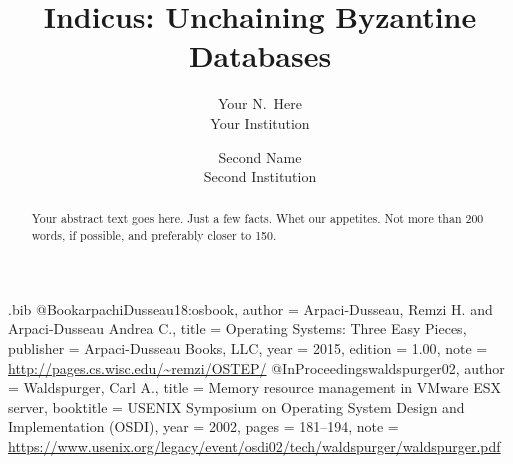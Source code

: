 \usepackage{filecontents}

\begin{filecontents}{\jobname.bib}
@Book{arpachiDusseau18:osbook,
  author =       {Arpaci-Dusseau, Remzi H. and Arpaci-Dusseau Andrea C.},
  title =        {Operating Systems: Three Easy Pieces},
  publisher =    {Arpaci-Dusseau Books, LLC},
  year =         2015,
  edition =      {1.00},
  note =         {\url{http://pages.cs.wisc.edu/~remzi/OSTEP/}}
}
@InProceedings{waldspurger02,
  author =       {Waldspurger, Carl A.},
  title =        {Memory resource management in {VMware ESX} server},
  booktitle =    {USENIX Symposium on Operating System Design and
                  Implementation (OSDI)},
  year =         2002,
  pages =        {181--194},
  note =         {\url{https://www.usenix.org/legacy/event/osdi02/tech/waldspurger/waldspurger.pdf}}}
\end{filecontents}



\date{}

\title{\Large \bf Indicus: Unchaining Byzantine Databases\\
 }

\author{
{\rm Your N.\ Here}\\
Your Institution
\and
{\rm Second Name}\\
Second Institution
} %

\maketitle

\begin{abstract}
Your abstract text goes here. Just a few facts. Whet our appetites.
Not more than 200 words, if possible, and preferably closer to 150.
\end{abstract}


